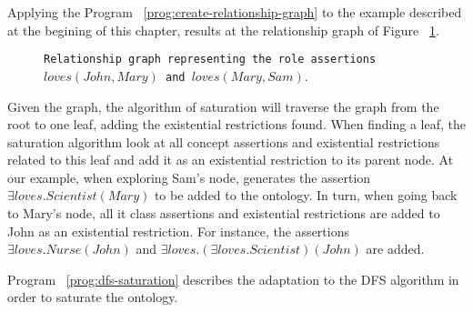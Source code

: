 Applying the Program ~\ref{prog:create-relationship-graph} to the example described at the begining of this chapter, results at the relationship graph of Figure ~\ref{fig:graph-1}.

\begin{figure}
    \centering
    
    \caption{\texttt{Relationship graph representing the role assertions $loves(John, Mary)$ and $loves(Mary, Sam)$}.\label{fig:graph-1}}
\end{figure}

Given the graph, the algorithm of saturation will traverse the graph from the root to one leaf, adding the existential restrictions found. When finding a leaf, the saturation algorithm look at all concept assertions and existential restrictions related to this leaf and add it as an existential restriction to its parent node. At our example, when exploring Sam's node, generates the assertion $\exists loves.Scientist(Mary)$ to be added to the ontology. In turn, when going back to Mary's node, all it class assertions and existential restrictions are added to John as an existential restriction. For instance, the assertions $\exists loves.Nurse(John)$ and $\exists loves.(\exists loves.Scientist)(John)$ are added.

Program ~\ref{prog:dfs-saturation} describes the adaptation to the DFS algorithm in order to saturate the ontology.


